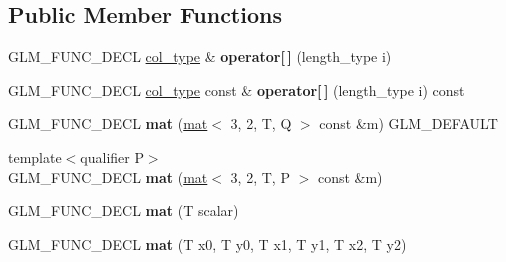 \subsection*{Public Member Functions}
\begin{DoxyCompactItemize}
\item 
\mbox{\label{structglm_1_1mat_3_013_00_012_00_01T_00_01Q_01_4_ab749a8bb52d92b278cdfdd6de7201b03}} 
G\+L\+M\+\_\+\+F\+U\+N\+C\+\_\+\+D\+E\+CL \hyperlink{structglm_1_1vec_3_012_00_01T_00_01Q_01_4}{col\+\_\+type} \& {\bfseries operator\mbox{[}$\,$\mbox{]}} (length\+\_\+type i)
\item 
\mbox{\label{structglm_1_1mat_3_013_00_012_00_01T_00_01Q_01_4_a73a97c49ef108592edf14b0ac70f8264}} 
G\+L\+M\+\_\+\+F\+U\+N\+C\+\_\+\+D\+E\+CL \hyperlink{structglm_1_1vec_3_012_00_01T_00_01Q_01_4}{col\+\_\+type} const  \& {\bfseries operator\mbox{[}$\,$\mbox{]}} (length\+\_\+type i) const
\item 
\mbox{\label{structglm_1_1mat_3_013_00_012_00_01T_00_01Q_01_4_ac43b49f1e4f1a91b06232fb1f2e3bb50}} 
G\+L\+M\+\_\+\+F\+U\+N\+C\+\_\+\+D\+E\+CL {\bfseries mat} (\hyperlink{structglm_1_1mat}{mat}$<$ 3, 2, T, Q $>$ const \&m) G\+L\+M\+\_\+\+D\+E\+F\+A\+U\+LT
\item 
\mbox{\label{structglm_1_1mat_3_013_00_012_00_01T_00_01Q_01_4_a54071dbd910e0b15d72103c46cbcbfde}} 
{\footnotesize template$<$qualifier P$>$ }\\G\+L\+M\+\_\+\+F\+U\+N\+C\+\_\+\+D\+E\+CL {\bfseries mat} (\hyperlink{structglm_1_1mat}{mat}$<$ 3, 2, T, P $>$ const \&m)
\item 
\mbox{\label{structglm_1_1mat_3_013_00_012_00_01T_00_01Q_01_4_ab321faf76a4bd6ab66d59783bf9863b1}} 
G\+L\+M\+\_\+\+F\+U\+N\+C\+\_\+\+D\+E\+CL {\bfseries mat} (T scalar)
\item 
\mbox{\label{structglm_1_1mat_3_013_00_012_00_01T_00_01Q_01_4_a13c121b21ee3acd7f614a55507ad7b4a}} 
G\+L\+M\+\_\+\+F\+U\+N\+C\+\_\+\+D\+E\+CL {\bfseries mat} (T x0, T y0, T x1, T y1, T x2, T y2)

\end{DoxyCompactItemize}
